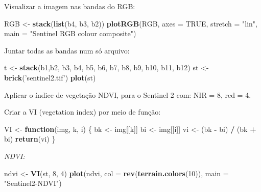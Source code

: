 \documentclass[
]{book}
\newenvironment{Shaded}{\begin{snugshade}}{\end{snugshade}}
\newcommand{\ControlFlowTok}[1]{\textcolor[rgb]{0.13,0.29,0.53}{\textbf{#1}}}
\newcommand{\DataTypeTok}[1]{\textcolor[rgb]{0.13,0.29,0.53}{#1}}
\newcommand{\DecValTok}[1]{\textcolor[rgb]{0.00,0.00,0.81}{#1}}
\newcommand{\KeywordTok}[1]{\textcolor[rgb]{0.13,0.29,0.53}{\textbf{#1}}}
\newcommand{\NormalTok}[1]{#1}
\newcommand{\OperatorTok}[1]{\textcolor[rgb]{0.81,0.36,0.00}{\textbf{#1}}}
\newcommand{\OtherTok}[1]{\textcolor[rgb]{0.56,0.35,0.01}{#1}}
\newcommand{\StringTok}[1]{\textcolor[rgb]{0.31,0.60,0.02}{#1}}
\begin{document}
Visualizar a imagem nas bandas do RGB:

\begin{Shaded}
\begin{Highlighting}[]
\NormalTok{RGB <-}\StringTok{ }\KeywordTok{stack}\NormalTok{(}\KeywordTok{list}\NormalTok{(b4, b3, b2))              }
\KeywordTok{plotRGB}\NormalTok{(RGB, }\DataTypeTok{axes =} \OtherTok{TRUE}\NormalTok{, }\DataTypeTok{stretch =} \StringTok{"lin"}\NormalTok{, }\DataTypeTok{main =} \StringTok{"Sentinel RGB colour composite"}\NormalTok{)}
\end{Highlighting}
\end{Shaded}

Juntar todas as bandas num só arquivo:

\begin{Shaded}
\begin{Highlighting}[]
\NormalTok{t <-}\StringTok{ }\KeywordTok{stack}\NormalTok{(b1,b2, b3, b4, b5, b6, b7, b8, b9, b10, b11, b12)}
\NormalTok{st <-}\StringTok{ }\KeywordTok{brick}\NormalTok{(}\StringTok{'sentinel2.tif'}\NormalTok{)}
\KeywordTok{plot}\NormalTok{(st)}
\end{Highlighting}
\end{Shaded}

Aplicar o índice de vegetação NDVI, para o Sentinel 2 com: NIR = 8, red = 4.

Criar a VI (vegetation index) por meio de função:

\begin{Shaded}
\begin{Highlighting}[]
\NormalTok{VI <-}\StringTok{ }\ControlFlowTok{function}\NormalTok{(img, k, i) \{}
\NormalTok{  bk <-}\StringTok{ }\NormalTok{img[[k]]}
\NormalTok{  bi <-}\StringTok{ }\NormalTok{img[[i]]}
\NormalTok{  vi <-}\StringTok{ }\NormalTok{(bk }\OperatorTok{-}\StringTok{ }\NormalTok{bi) }\OperatorTok{/}\StringTok{ }\NormalTok{(bk }\OperatorTok{+}\StringTok{ }\NormalTok{bi)}
  \KeywordTok{return}\NormalTok{(vi)}
\NormalTok{\}}
\end{Highlighting}
\end{Shaded}

\emph{NDVI:}

\begin{Shaded}
\begin{Highlighting}[]
\NormalTok{ndvi <-}\StringTok{ }\KeywordTok{VI}\NormalTok{(st, }\DecValTok{8}\NormalTok{, }\DecValTok{4}\NormalTok{)}
\KeywordTok{plot}\NormalTok{(ndvi, }\DataTypeTok{col =} \KeywordTok{rev}\NormalTok{(}\KeywordTok{terrain.colors}\NormalTok{(}\DecValTok{10}\NormalTok{)), }\DataTypeTok{main =} \StringTok{"Sentinel2-NDVI"}\NormalTok{)}
\end{Highlighting}
\end{Shaded}
\end{document}
